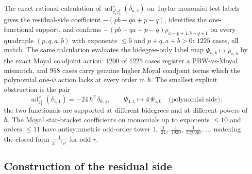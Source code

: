 \begin{rmk}
\label{rmk:app-defect-polarization-numerics}
  The exact rational calculation of
  \(\operatorname{ad}^\vee_{z_1^pz_2^q}(\delta_{a,b})\)
  on Taylor-monomial test labels gives the residual-side coefficient
  \(-(pb-qa+p-q)\), identifies the
  one-functional support, and confirms
  \(-(pb-qa+p-q)\rho_{a-p+1,b-q+1}\) on every quadruple \((p,q,a,b)\)
  with exponents \(\le 5\) and \(p+q,a+b>0\): \(1225\) cases, all match.
  The same calculation evaluates the bidegree-only label map
	  \(\widetilde\Psi_{a,b}\mapsto\rho_{a,b}\) by the exact Moyal coadjoint
	  action: \(1200\) of \(1225\) cases register a PBW-vs-Moyal mismatch,
	  and \(958\) cases carry genuine higher Moyal coadjoint terms which the
	  polynomial one-\(\psi\) action lacks at every order in
  \(\hbar\).  The smallest explicit obstruction is the pair
  \[
    \operatorname{ad}^\vee_{z_1^4}(\delta_{1,1})
      =-24\,\hbar^2\,\delta_{0,4},
    \qquad
    \widetilde\Psi_{1,1}\mapsto4\,\widetilde\Psi_{4,0}
    \quad\text{(polynomial side)};
  \]
  the two functionals are supported at different bidegrees and at
  different powers of \(\hbar\).  The Moyal star-bracket coefficients
  on monomials up to exponents \(\le 10\) and orders \(\le 11\) have
  antisymmetric odd-order tower
  \(1,\ \tfrac1{24},\ \tfrac1{1920},\ \tfrac1{322560},\ \dots\) matching
  the closed-form \(\tfrac{1}{2^{r-1}\,r!}\) for odd \(r\).
\end{rmk}

\subsection{Construction of the residual side}
\label{ssec:app-matlis-construction}

